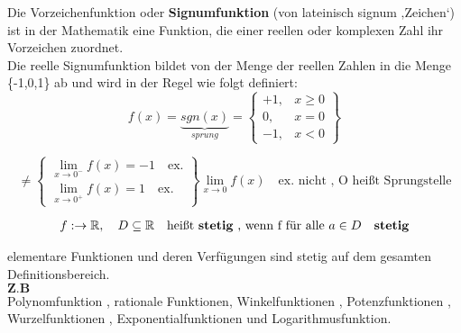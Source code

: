 \begin{definition}[ sgn(x)]
Die Vorzeichenfunktion oder \textbf{Signumfunktion} (von lateinisch signum ‚Zeichen‘) ist in der Mathematik eine Funktion, die einer reellen oder komplexen Zahl ihr Vorzeichen zuordnet.\\
Die reelle Signumfunktion bildet von der Menge der reellen Zahlen in die Menge \{-1,0,1\} ab und wird in der Regel wie folgt definiert:
$$ f(x) = \underbrace{sgn(x)}_{sprung}  =  \left\{\begin{array}{lr}
+ 1 , & x \geq 0\\
0 , & x = 0 \\
-1 , & x < 0 
        \end{array}\right\}$$ 
\end{definition}
$$
\neq \left\{\begin{array}{lr}
  \lim\limits_{x \rightarrow 0^-}{f(x)} = -1 \quad \text{ex.} \\
        \lim\limits_{x \rightarrow 0^+}{f(x)} = 1 \quad \text{ex.} 
        \end{array}\right\} \lim\limits_{x \rightarrow 0}{f(x)} \quad \text{ex. nicht , O heißt Sprungstelle}
$$  
\newpage
\begin{definition}
\begin{align*}
f : \rightarrow \mathbb{R} , \quad D \subseteq \mathbb{R} \quad \text{heißt \textbf{stetig} , wenn f für alle } a \in D \quad \textbf{stetig} 
\end{align*}
\end{definition}
\begin{example}
elementare Funktionen und deren Verfügungen sind stetig auf dem gesamten Definitionsbereich. \\
$\textbf{Z.B}$ \\
Polynomfunktion , rationale Funktionen, Winkelfunktionen , Potenzfunktionen , Wurzelfunktionen , Exponentialfunktionen und Logarithmusfunktion.
     
\end{example}


